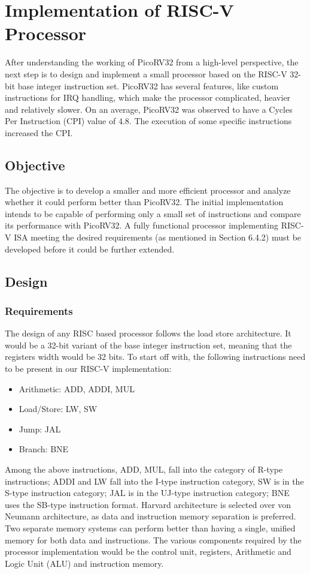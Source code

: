 \section{Implementation of RISC-V Processor}
 \label{sect6_4}
After understanding the working of PicoRV32 from a high-level perspective, the next step is to design and implement a small processor based on the RISC-V 32-bit base integer instruction set. PicoRV32 has several features, like custom instructions for IRQ handling, which make the processor complicated, heavier and relatively slower. 
On an average, PicoRV32 was observed to have a Cycles Per Instruction (CPI) value of 4.8. The execution of some specific instructions increased the CPI. 

\subsection{Objective}
\label{sect6_4_1}
The objective is to develop a smaller and more efficient processor and analyze whether it could perform better than PicoRV32. The initial implementation intends to be capable of performing only a small set of instructions and compare its performance with PicoRV32. A fully functional processor implementing RISC-V ISA meeting the desired requirements (as mentioned in Section 6.4.2) must be developed before it could be further extended. 

\subsection{Design}
\label{sect6_4_2}
\subsubsection{Requirements}
\label{section:sect6_4_2_1}
The design of any RISC based processor follows the load store architecture. It would be a 32-bit variant of the base integer instruction set, meaning that the registers width would be 32 bits. To start off with, the following instructions need to be present in our RISC-V implementation:
\begin{itemize}
\item Arithmetic: ADD, ADDI, MUL
\item Load/Store: LW, SW
\item Jump: JAL
\item Branch: BNE
\end{itemize}
Among the above instructions, ADD, MUL, fall into the category of R-type instructions; ADDI and LW fall into the I-type instruction category, SW is in the S-type instruction category; JAL is in the UJ-type instruction category; BNE uses the SB-type instruction format. \newline\newline
Harvard architecture is selected over von Neumann architecture, as data and instruction memory separation is preferred. Two separate memory systems can perform better than having a single, unified memory for both data and instructions. The various components required by the processor implementation would be the control unit, registers, Arithmetic and Logic Unit (ALU) and instruction memory.

